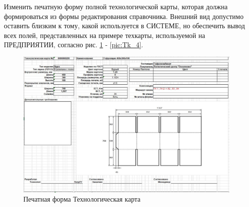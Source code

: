 


 Изменить печатную форму полной технологической карты, которая должна формироваться из формы редактирования справочника.
 Внешний вид допустимо оставить близким к тому, какой используется в СИСТЕМЕ, но обеспечить вывод всех полей, представленных на примере техкарты, используемой на ПРЕДПРИЯТИИ, согласно рис. \ref{pic:Tk_1} - \ref{pic:Tk_4}.

 




\begin{figure}
  \includegraphics[height=0.8\textheight, width=\textwidth, angle=90,
  keepaspectratio] {50_Pics/Tk_1.JPG}
  \caption{Печатная форма Технологическая карта}
  \label{pic:Tk_1}
\end{figure}

